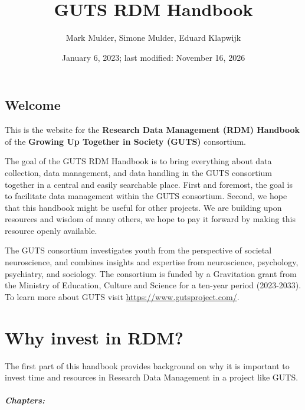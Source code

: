 \documentclass[
  letterpaper,
  DIV=11,
  numbers=noendperiod]{scrreprt}
\title{GUTS RDM Handbook}
\author{Mark Mulder, Simone Mulder, Eduard Klapwijk}
\date{January 6, 2023; last modified: November 16, 2026}
\renewcommand*\contentsname{Table of contents}
\newcommand\contentsname{Table of contents}
\begin{document}
\maketitle

\renewcommand*\contentsname{Table of contents}
{
\hypersetup{linkcolor=}
\setcounter{tocdepth}{2}
\tableofcontents
}


\chapter*{Welcome}\label{welcome}


This is the website for the \textbf{Research Data Management (RDM)
Handbook} of the \textbf{Growing Up Together in Society (GUTS)}
consortium.

The goal of the GUTS RDM Handbook is to bring everything about data
collection, data management, and data handling in the GUTS consortium
together in a central and easily searchable place. First and foremost,
the goal is to facilitate data management within the GUTS consortium.
Second, we hope that this handbook might be useful for other projects.
We are building upon resources and wisdom of many others, we hope to pay
it forward by making this resource openly available.

The GUTS consortium investigates youth from the perspective of societal
neuroscience, and combines insights and expertise from neuroscience,
psychology, psychiatry, and sociology. The consortium is funded by a
Gravitation grant from the Ministry of Education, Culture and Science
for a ten-year period (2023-2033). To learn more about GUTS visit
\url{https://www.gutsproject.com/}.

\part{Why invest in RDM?}

The first part of this handbook provides background on why it is
important to invest time and resources in Research Data Management in a
project like GUTS.

\subsubsection*{Chapters:}\label{chapters}
\end{document}
